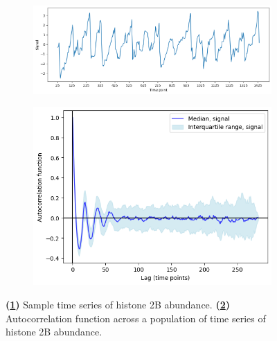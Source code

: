 \begin{figure}
  \centering
  \begin{subfigure}[t]{0.8\textwidth}
  \centering
    \includegraphics[width=\linewidth]{acf_fhn_biol_ts.png}
    \caption{
    }
    \label{fig:acf-fhn-biol-ts}
  \end{subfigure}

  \begin{subfigure}[t]{0.5\textwidth}
  \centering
    \includegraphics[width=\linewidth]{acf_fhn_biol_acf.png}
    \caption{
    }
    \label{fig:acf-fhn-biol-acf}
  \end{subfigure}


  \caption[
    Sample time series of histone 2B abundance, its autocorrelation function, and fitting exponential decay functions.
  ]{
    \textbf{(\ref{fig:acf-fhn-biol-ts})}
    Sample time series of histone 2B abundance.
    \textbf{(\ref{fig:acf-fhn-biol-acf})}
    Autocorrelation function across a population of time series of histone 2B abundance.
  }
  \label{fig:acf-fhn-biol}
\end{figure}

